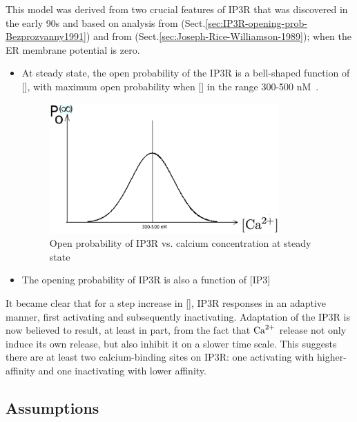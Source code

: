This model was derived from two crucial features of IP3R that was discovered in
the early 90s and based on analysis from \citep{bezprozvanny1991ip3r}
(Sect.\ref{sec:IP3R-opening-prob-Bezprozvanny1991}) and from
\citep{joseph1989ip3} (Sect.\ref{sec:Joseph-Rice-Williamson-1989}); when the ER
membrane potential is zero.

\begin{itemize}
  \item At steady state, the open probability of the IP3R is a
  bell-shaped function of [], with maximum open probability
  when [] in the range 300-500 nM~\citep{bezprozvanny1991ip3r}.


\begin{figure}[hbt]
 \centerline{\includegraphics[height=5cm]{./images/Popen_IP3R.eps}}
\caption{Open probability of IP3R vs. calcium concentration at steady state}
\label{fig:Popen_IP3R}
\end{figure}

\item The opening probability of IP3R is also a function of [IP3]
\end{itemize}

It became clear that for a step increase in [], IP3R responses in an
adaptive manner, first activating and subsequently inactivating. Adaptation of
the IP3R is now believed to result, at least in part, from the fact that ${\text{Ca}^{2+}}$
release not only induce its own release, but also inhibit it on a slower time
scale. This suggests there are at least two calcium-binding sites on IP3R: one
activating with higher-affinity and one inactivating with lower affinity.

\subsection{Assumptions}

